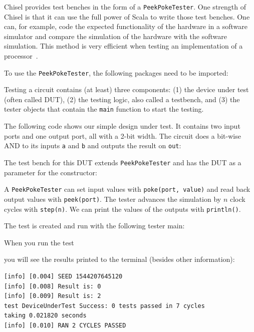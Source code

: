 \documentclass[%
    10pt,
    headinclude, footexclude,
    openright, %
    notitlepage,
    cleardoubleempty,
    headsepline,
    pointlessnumbers,
    bibtotoc, idxtotoc,
    ]{scrbook}
\newcommand{\code}[1]{{\small{\texttt{#1}}}}
\begin{document}
Chisel provides test benches in the form of a \code{PeekPokeTester}.
One strength of Chisel is that it can use the full power of Scala to write those
test benches. One can, for example, code the expected functionality of the hardware
in a software simulator and compare the simulation of the hardware with the
software simulation. This method is very efficient when testing an implementation
of a processor~\cite{lipsi:arcs2018}.

To use the \code{PeekPokeTester}, the following packages need to be imported:


\noindent Testing a circuit contains (at least) three components: (1) the device under test (often
called DUT), (2) the testing logic, also called a testbench, and (3) the tester objects
that contain the \code{main} function to start the testing.

The following code shows our simple design under test. It contains two input
ports and one output port, all with a 2-bit width. The circuit does a bit-wise AND
to its inputs \code{a} and \code{b} and outputs the result on \code{out}:


\noindent The test bench for this DUT extends \code{PeekPokeTester} and has
the DUT as a parameter for the constructor:


\noindent A \code{PeekPokeTester} can set input values with \code{poke(port, value)} and
read back output values with \code{peek(port)}. The tester advances the simulation by $n$
clock cycles with \code{step(n)}.
We can print the values of the outputs with \code{println()}.

The test is created and run with the following tester main:


\noindent When you run the test


you will see the results printed to the terminal
(besides other information):

\begin{verbatim}
[info] [0.004] SEED 1544207645120
[info] [0.008] Result is: 0
[info] [0.009] Result is: 2
test DeviceUnderTest Success: 0 tests passed in 7 cycles
taking 0.021820 seconds
[info] [0.010] RAN 2 CYCLES PASSED
\end{verbatim}
\end{document}
